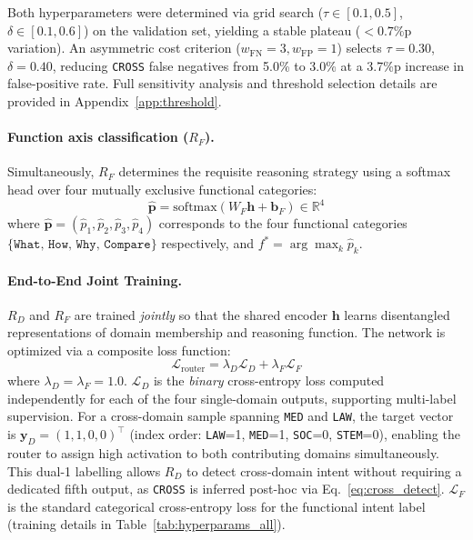 \documentclass[a4paper,fleql]{cas-sc}
\begin{document}
Both hyperparameters were determined via grid search
($\tau \in [0.1, 0.5]$, $\delta \in [0.1, 0.6]$) on the validation set,
yielding a stable plateau ($<0.7$\%p variation). An asymmetric cost
criterion ($w_{\text{FN}}=3, w_{\text{FP}}=1$) selects
$\tau = 0.30$, $\delta = 0.40$, reducing \texttt{CROSS} false negatives
from 5.0\% to 3.0\% at a 3.7\%p increase in false-positive rate.
Full sensitivity analysis and threshold selection details are provided in
Appendix~\ref{app:threshold}.

\paragraph{Function axis classification ($R_F$).}
Simultaneously, $R_F$ determines the requisite reasoning strategy using a
softmax head over four mutually exclusive functional categories:
\begin{equation}
    \hat{\mathbf{p}} = \text{softmax}(W_F \mathbf{h} + \mathbf{b}_F)
    \in \mathbb{R}^4
    \label{eq:func}
\end{equation}
where $\hat{\mathbf{p}} = (\hat{p}_1, \hat{p}_2, \hat{p}_3, \hat{p}_4)$
corresponds to the four functional categories
$\{\texttt{What},\, \texttt{How},\, \texttt{Why},\, \texttt{Compare}\}$
respectively, and $f^* = \arg\max_k \hat{p}_k$.

\paragraph{End-to-End Joint Training.}
$R_D$ and $R_F$ are trained \emph{jointly} so that the shared encoder
$\mathbf{h}$ learns disentangled representations of domain membership and
reasoning function. The network is optimized via a composite loss function:
\begin{equation}
    \mathcal{L}_{\text{router}} = \lambda_D \mathcal{L}_{D}
    + \lambda_F \mathcal{L}_{F}
    \label{eq:joint_loss}
\end{equation}
where $\lambda_D = \lambda_F = 1.0$.
$\mathcal{L}_{D}$ is the \emph{binary} cross-entropy loss computed
independently for each of the four single-domain outputs, supporting
multi-label supervision. For a cross-domain sample spanning
\texttt{MED} and \texttt{LAW}, the target vector is
$\mathbf{y}_D = (1, 1, 0, 0)^\top$
(index order: \texttt{LAW}=1, \texttt{MED}=1, \texttt{SOC}=0,
\texttt{STEM}=0), enabling the router to assign high activation to both
contributing domains simultaneously. This dual-1 labelling allows
$R_D$ to detect cross-domain intent without requiring a dedicated
fifth output, as \texttt{CROSS} is inferred post-hoc via
Eq.~\ref{eq:cross_detect}.
$\mathcal{L}_{F}$ is the standard categorical cross-entropy loss for the functional intent label (training details in Table~\ref{tab:hyperparams_all}).
\end{document}
